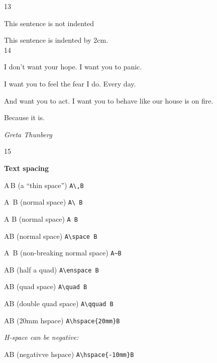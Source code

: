 \documentclass{article} %
\begin{document}

13


\noindent This sentence is not indented 

\parindent=20mm This sentence is indented by 2cm.\\

14

\vspace*{\fill} %

I don't want your hope. I want you to panic. 

\medskip I want you to feel the fear I do. Every day. 

\bigskip And want you to act. 
I want you to behave like our house is on fire.

\vspace{19pt} Because it is.  

\vspace{16mm}

\hfil\textit{Greta Thunberg}\hfil

\vspace*{\fill}

15
\parindent=0mm \parskip=2mm


\textbf{Text spacing}

A\,B (a ``thin space'') \verb|A\,B|

A\ B (normal space) \verb|A\ B|

A  B (normal space) \verb|A B|

A\space B (normal space) \verb|A\space B|

A~B       (non-breaking normal space) \verb|A~B|

A\enspace B (half a quad) \verb|A\enspace B|

A\quad B (quad space) \verb|A\quad B|

A\qquad B (double quad space) \verb|A\qquad B|

A\hspace{20mm}B (20mm hspace) \verb|A\hspace{20mm}B|

\textit{H-space can be negative:}

A\hspace*{-10mm}B  (negativve hspace) \verb|A\hspace{-10mm}B|
\end{document}
